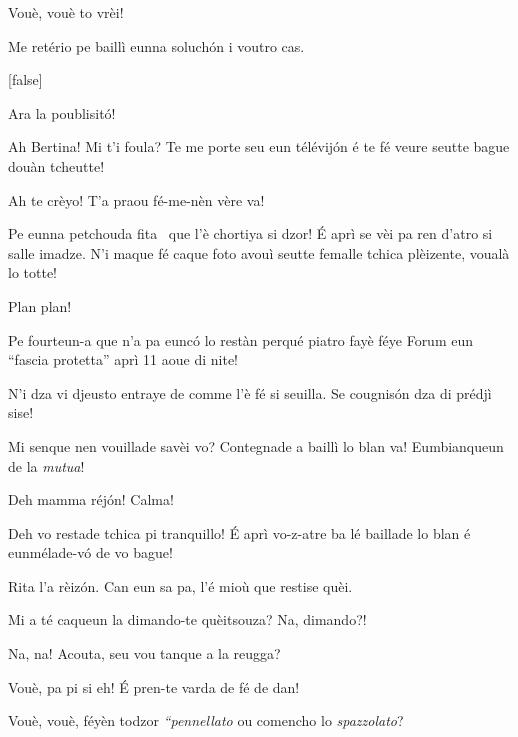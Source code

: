 \begin{drama}
\Pascalspeaks {} Vouè, vouè to vrèi!

\DzeudzoSenliquerspeaks Me retério pe baillì eunna soluchón i voutro cas.

[false]



\Ritaspeaks {} Ara la poublisitó!


\Tobiespeaks {} Ah Bertina! Mi t'i foula? Te me porte seu eun télévij\'on é te fé veure seutte bague douàn tcheutte!

\Bertinaspeaks {} Ah te crèyo! T’a praou fé-me-nèn vère va! 

\Tobiespeaks Pe eunna petchouda fita \fitaa\ que l’è chortiya si dzor! É aprì se vèi pa ren d’atro si salle imadze. N’i maque fé caque foto avouì seutte femalle tchica plèizente, voualà lo totte!

\Pascalspeaks {} Plan plan!

\Bertinaspeaks Pe fourteun-a que n’a pa eunc\'o lo restàn perqué piatro fayè féye Forum eun ``fascia protetta'' aprì 11 aoue di nite!

\Eumprezeospeaks N’i dza vi djeusto entraye de comme l’è fé si seuilla. Se cougnisón dza di prédjì sise!

\Tobiespeaks Mi senque nen vouillade savèi vo? Contegnade a baillì lo blan va! Eumbianqueun de la \textit{mutua}!

\Simonspeaks Deh mamma réjón! Calma!

\Ritaspeaks {} Deh vo restade tchica pi tranquillo!  É aprì vo-z-atre ba lé baillade lo blan é eunmélade-vó de vo bague!

\Simonspeaks Rita l’a rèizón. Can eun sa pa, l’é mioù que restise quèi.

\Eumprezeospeaks Mi a té caqueun la dimando-te quèitsouza? Na, dimando?!

\Simonspeaks Na, na! Acouta, seu vou tanque a la reugga?

\Eumprezeospeaks Vouè, pa pi si eh! É pren-te varda de fé de dan!

\Simonspeaks Vouè, vouè, féyèn todzor \textit{“pennellato} ou comencho lo \textit{spazzolato}?


\end{drama}
